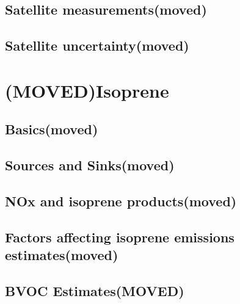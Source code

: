   \subsection{Satellite measurements(moved)}
  \subsection{Satellite uncertainty(moved)}
    
\section{(MOVED)Isoprene}
\label{ch_LitRev:sec:isoprene}

  \subsection{Basics(moved)}

  \subsection{Sources and Sinks(moved)}
    
  \subsection{NOx and isoprene products(moved)}
    \label{Ch_LitRev:sec:IsopNox}
  \subsection{Factors affecting isoprene emissions estimates(moved)}
    
  \subsection{BVOC Estimates(MOVED)}
  \label{ch_LitRev:sec:BVOCestimates}
    

